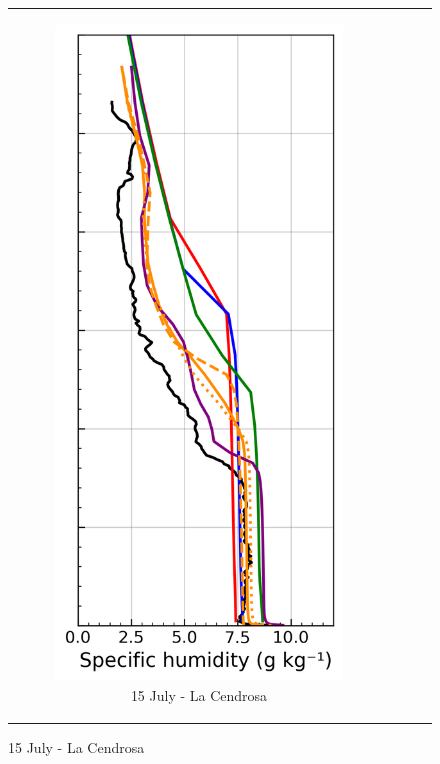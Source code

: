 \begin{figure}[hbtp]
{\begin{tabular}{@{}cccc@{}}
        \begin{subfigure}[t]{0.29\textwidth}
            \caption{15 July - La Cendrosa}
            \includegraphics[width=\textwidth]{images/chap6/profiles/profile_cendrosa_ovap_1507_sensbins.png}

\end{subfigure}
\end{tabular}}
\end{figure}
